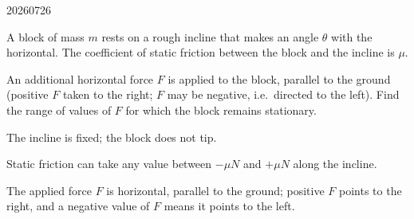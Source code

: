 

\begin{problem}{20260726}

A block of mass $m$ rests on a rough incline that makes an angle $\theta$ with the horizontal.  The coefficient of static friction between the block and the incline is $\mu$.

\begin{center}
\end{center}

An additional horizontal force $F$ is applied to the block, parallel to the ground (positive $F$ taken to the right; $F$ may be negative, i.e.\ directed to the left).  Find the range of values of $F$ for which the block remains stationary.

\begin{assumptions}
  \item The incline is fixed; the block does not tip.
  \item Static friction can take any value between $-\mu N$ and $+\mu N$ along the incline.
  \item The applied force $F$ is horizontal, parallel to the ground; positive $F$ points to the right, and a negative value of $F$ means it points to the left.
\end{assumptions}

\end{problem}

